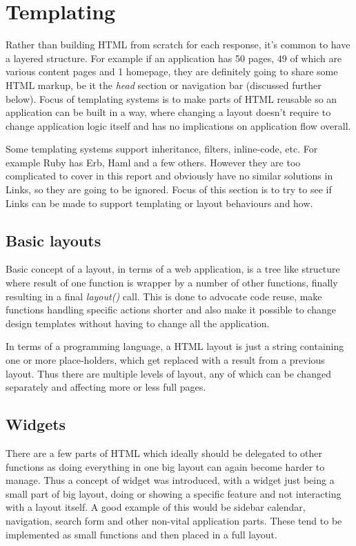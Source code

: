 \chapter{Templating}

Rather than building HTML from scratch for each response, it's common to have a layered structure. For example if an application has 50 pages, 49 of which are various content pages and 1 homepage, they are definitely going to share some HTML markup, be it the \textit{head} section or navigation bar (discussed further below). Focus of templating systems is to make parts of HTML reusable so an application can be built in a way, where changing a layout doesn't require to change application logic itself and has no implications on application flow overall.

Some templating systems support inheritance, filters, inline-code, etc. For example Ruby has Erb, Haml and a few others. However they are too complicated to cover in this report and obviously have no similar solutions in Links, so they are going to be ignored. Focus of this section is to try to see if Links can be made to support templating or layout behaviours and how.

\section{Basic layouts}

Basic concept of a layout, in terms of a web application, is a tree like structure where result of one function is wrapper by a number of other functions, finally resulting in a final \textit{layout()} call. This is done to advocate code reuse, make functions handling specific actions shorter and also make it possible to change design templates without having to change all the application.

In terms of a programming language, a HTML layout is just a string containing one or more place-holders, which get replaced with a result from a previous layout. Thus there are multiple levels of layout, any of which can be changed separately and affecting more or less full pages. 

\section{Widgets}

There are a few parts of HTML which ideally should be delegated to other functions as doing everything in one big layout can again become harder to manage. Thus a concept of widget was introduced, with a widget just being a small part of big layout, doing or showing a specific feature and not interacting with a layout itself. A good example of this would be sidebar calendar, navigation, search form and other non-vital application parts. These tend to be implemented as small functions and then placed in a full layout.

